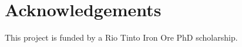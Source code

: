 \documentclass[manuscript.tex]{subfiles}
\begin{document}
\section{Acknowledgements}
This project is funded by a Rio Tinto Iron Ore PhD scholarship.

\printbibliography{}



\end{document}
